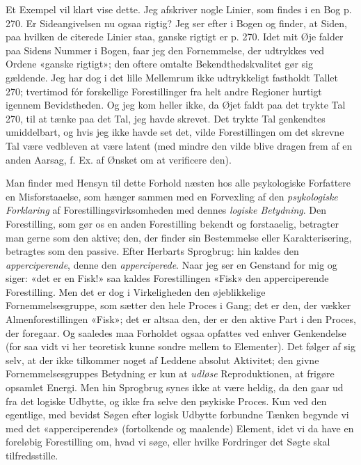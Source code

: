 \documentclass[12pt,a4paper,openany]{book}
\newcommand{\opage}[1]{\marginnote{\footnotesize\textit{[#1]}}}
\begin{document}
Et Exempel vil klart vise dette. Jeg afskriver nogle Linier, som findes i en
Bog p. 270. Er Sideangivelsen nu ogsaa rigtig? Jeg ser efter i Bogen og finder,
at Siden, paa hvilken de citerede Linier staa, ganske rigtigt er p. 270. Idet
mit Øje falder paa Sidens Nummer i Bogen, faar jeg den Fornemmelse, der
udtrykkes ved Ordene «ganske rigtigt»; den oftere omtalte Bekendthedskvalitet
gør sig gældende. Jeg har dog i det lille Mellemrum ikke udtrykkeligt fastholdt
Tallet 270; tvertimod fór forskellige Forestillinger fra helt andre Regioner
hurtigt igennem Bevidstheden. Og jeg kom heller ikke, da Øjet faldt paa det
trykte Tal 270, til at tænke paa det Tal, jeg havde skrevet. Det trykte Tal
genkendtes umiddelbart, og hvis jeg ikke havde set det, vilde Forestillingen om
det skrevne Tal være vedbleven at være latent (med mindre den vilde blive
dragen frem af en anden Aarsag, f. Ex. af Ønsket om at verificere den).

Man finder med Hensyn til dette Forhold næsten hos alle psykologiske Forfattere
en Misforstaaelse, som hænger sammen med en Forvexling af den
\emph{psykologiske Forklaring} af Forestillingsvirksomheden med dennes
\emph{logiske Betydning}. Den Forestilling, som gør os en anden Forestilling
bekendt og forstaaelig, betragter man gerne som den aktive; den, der finder sin
Bestemmelse eller Karakterisering, betragtes som den passive. Efter Herbarts
Sprogbrug: hin kaldes den \emph{apperciperende}, denne den
\emph{apperciperede}. Naar jeg ser en Genstand for mig og siger: «det er en
Fisk!» saa kaldes Forestillingen «Fisk» den apperciperende Forestilling. Men
det er dog i Virkeligheden den øjeblikkelige Fornemmelsesgruppe, som sætter den
hele Proces i Gang; det er den, der vækker Almenforestillingen «Fisk»; det er
altsaa den, der er den aktive Part i den Proces, der foregaar. Og saaledes maa
Forholdet ogsaa opfattes ved enhver Genkendelse (for saa vidt vi her teoretisk
kunne sondre mellem to Elementer). Det følger af sig selv, at der ikke
tilkommer noget af Leddene absolut Aktivitet; den givne Fornemmelsesgruppes
Betydning er kun at \emph{udløse} Reproduktionen, at frigøre opsamlet Energi.
Men hin Sprogbrug synes ikke at være heldig, da den gaar ud fra det logiske
Udbytte, og ikke fra selve den psykiske Proces.
\setcounter{footnote}{0}%
\opage{25}Kun ved den egentlige, med bevidst Søgen efter logisk Udbytte
forbundne Tænken begynde vi med det «apperciperende» (fortolkende og maalende)
Element, idet vi da have en foreløbig Forestilling om, hvad vi søge, eller
hvilke Fordringer det Søgte skal tilfredsstille.
\end{document}
